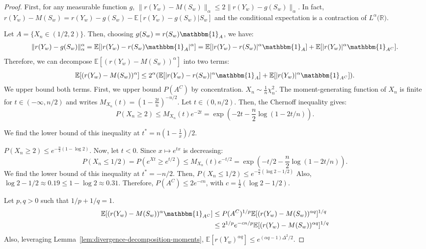 \documentclass{article}
\theoremstyle{plain}
\theoremstyle{definition}
\theoremstyle{remark}
\begin{document}
    \begin{proof}
    First, for any measurable function $g$, $\|r(Y_w) - M(S_w)\|_\alpha \leq 2\|r(Y_w) - g(S_w)\|_\alpha$.
    In fact, $r(Y_w) - M(S_w) = r(Y_w) - g(S_w) - \mathbb{E}[r(Y_w) - g(S_w) | S_w]$ and the conditional expectation is a contraction of $L^\alpha(\mathbb{R)}$.
    
    Let $A = \{X_n \in (1/2, 2)\}$. Then, choosing $g(S_w) = r(S_w) \mathbbm{1}_A$, we have:
    \begin{align*}
        \|r(Y_w)-g(S_w)\|_\alpha^\alpha = \mathbb{E}[|r(Y_w) - r(S_w) \mathbbm{1}_A|^\alpha] = \mathbb{E}[|r(Y_w) - r(S_w)|^\alpha \mathbbm{1}_A] + \mathbb{E}[|r(Y_w)|^\alpha \mathbbm{1}_{A^C}].
    \end{align*}
        Therefore, we can decompose $\mathbb{E}[(r(Y_w) - M(S_w))^\alpha]$ into two terms:
    \[\mathbb{E}[(r(Y_w) - M(S_w))^\alpha] \leq  2^\alpha (\mathbb{E}[|r(Y_w) - r(S_w)|^\alpha \mathbbm{1}_{A}] + \mathbb{E}[|r(Y_w)|^\alpha\mathbbm{1}_{A^C}]).\]
    We upper bound both terms.
    First, we upper bound $P(A^C)$ by concentration. $X_n \sim \frac{1}{n}\chi_n^2$. The moment-generating function of $X_n$ is finite for $t \in (-\infty, n/2)$ and writes $M_{X_n}(t) = \left(1- \frac{2t}{n}\right)^{-n/2}$. Let $t\in (0,n/2)$. Then, the Chernoff inequality gives:
    \[P(X_n \geq 2) \leq M_{X_n}(t) e^{-2t}  =\exp\left(-2t - \frac{n}{2} \log(1-2t/n) \right).\]

    
    We find the lower bound of this inequality at $t^* =  n(1-\frac{1}{x})/2$.
    
    $P(X_n \geq 2) \leq e^{-\frac{n}{2}(1- \log 2)}$.
    Now, let $t < 0$. Since $x \mapsto e^{tx}$ is decreasing:
    \[P(X_n \leq 1/2) = P(e^{Xt} \geq e^{t/2})  \leq M_{X_n}(t) e^{-t/2} = \exp\left(-t/2 - \frac{n}{2} \log(1-2t/n) \right).\]
    We find the lower bound of this inequality at $t^* = -n/2$. Then, $P(X_n \leq 1/2) \leq e^{-\frac{n}{2}(\log 2 - 1/2)}$
    Also, $\log 2 - 1/2 \approx 0.19 \leq 1 - \log 2 \approx 0.31$.
    Therefore, $P(A^C) \leq 2 e^{-cn}$, with $c = \frac{1}{2}(\log 2 - 1/2)$.
    
    Let $p,q > 0$ such that $1/p + 1/q = 1$.
    \begin{align*}
        \mathbb{E}[(r(Y_w) - M(S_w))^\alpha\mathbbm{1}_{A^C}] &\leq P(A^C)^{1/p} \mathbb{E}[(r(Y_w) - M(S_w))^{\alpha q}]^{1/q} \\
        &\leq  2^{1/p}e^{-cn/p} \mathbb{E}[(r(Y_w) - M(S_w))^{\alpha q}]^{1/q}\\
    \end{align*}
    Also, leveraging Lemma~\ref{lem:divergence-decomposition-moments}, $\mathbb{E}[r(Y_w)^{\alpha q}] \leq e^{(\alpha q -1) \Delta^2/2}$.
    

\end{proof}
\end{document}
